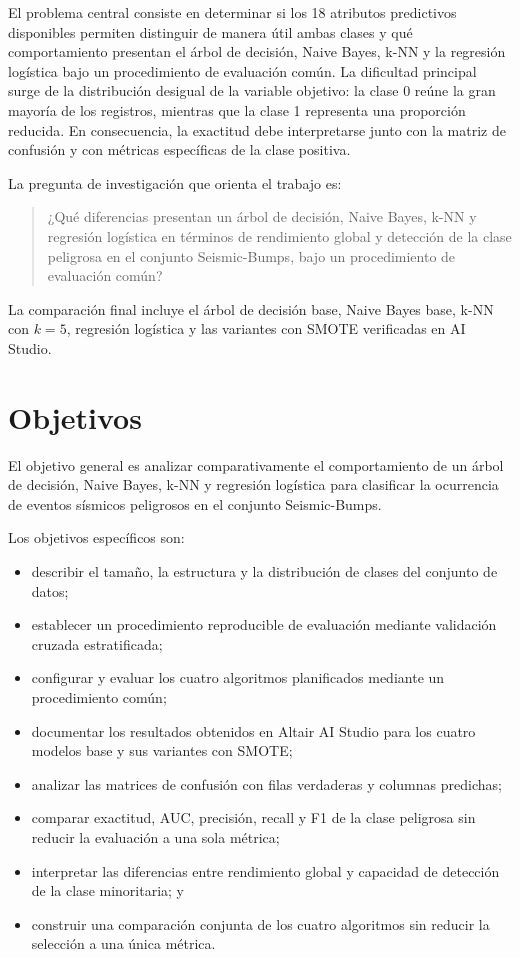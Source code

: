 \documentclass[12pt,a4paper]{article}
\begin{document}
El problema central consiste en determinar si los 18 atributos predictivos disponibles permiten distinguir de manera útil ambas clases y qué comportamiento presentan el árbol de decisión, Naive Bayes, k-NN y la regresión logística bajo un procedimiento de evaluación común. La dificultad principal surge de la distribución desigual de la variable objetivo: la clase 0 reúne la gran mayoría de los registros, mientras que la clase 1 representa una proporción reducida. En consecuencia, la exactitud debe interpretarse junto con la matriz de confusión y con métricas específicas de la clase positiva.

La pregunta de investigación que orienta el trabajo es:
\begin{quote}
¿Qué diferencias presentan un árbol de decisión, Naive Bayes, k-NN y regresión logística en términos de rendimiento global y detección de la clase peligrosa en el conjunto Seismic-Bumps, bajo un procedimiento de evaluación común?
\end{quote}
La comparación final incluye el árbol de decisión base, Naive Bayes base, k-NN con $k=5$, regresión logística y las variantes con SMOTE verificadas en AI Studio.

\section{Objetivos}
El objetivo general es analizar comparativamente el comportamiento de un árbol de decisión, Naive Bayes, k-NN y regresión logística para clasificar la ocurrencia de eventos sísmicos peligrosos en el conjunto Seismic-Bumps.

Los objetivos específicos son:
\begin{itemize}
\item describir el tamaño, la estructura y la distribución de clases del conjunto de datos;
\item establecer un procedimiento reproducible de evaluación mediante validación cruzada estratificada;
\item configurar y evaluar los cuatro algoritmos planificados mediante un procedimiento común;
\item documentar los resultados obtenidos en Altair AI Studio para los cuatro modelos base y sus variantes con SMOTE;
\item analizar las matrices de confusión con filas verdaderas y columnas predichas;
\item comparar exactitud, AUC, precisión, recall y F1 de la clase peligrosa sin reducir la evaluación a una sola métrica;
\item interpretar las diferencias entre rendimiento global y capacidad de detección de la clase minoritaria; y
\item construir una comparación conjunta de los cuatro algoritmos sin reducir la selección a una única métrica.
\end{itemize}
\end{document}

